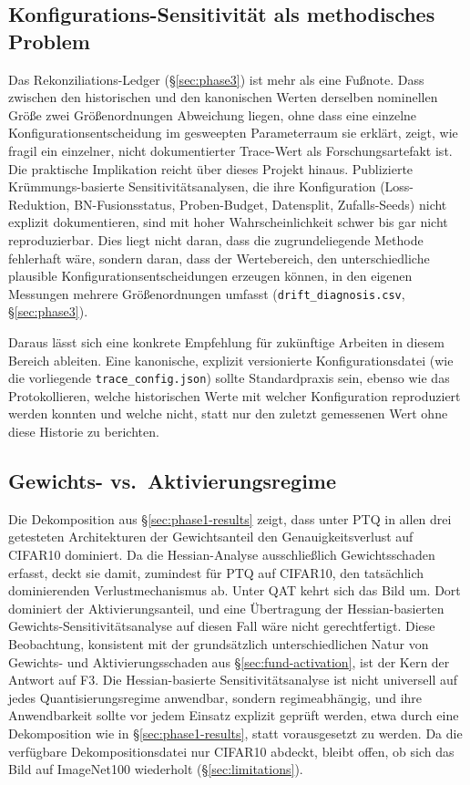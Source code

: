 \subsection{Konfigurations-Sensitivität als methodisches Problem}
\label{sec:disc-config}

Das Rekonziliations-Ledger (\S\ref{sec:phase3}) ist mehr als eine Fußnote. Dass zwischen den historischen und den kanonischen Werten derselben nominellen Größe zwei Größenordnungen Abweichung liegen, ohne dass eine einzelne Konfigurationsentscheidung im gesweepten Parameterraum sie erklärt, zeigt, wie fragil ein einzelner, nicht dokumentierter Trace-Wert als Forschungsartefakt ist. Die praktische Implikation reicht über dieses Projekt hinaus. Publizierte Krümmungs-basierte Sensitivitätsanalysen, die ihre Konfiguration (Loss-Reduktion, BN-Fusionsstatus, Proben-Budget, Datensplit, Zufalls-Seeds) nicht explizit dokumentieren, sind mit hoher Wahrscheinlichkeit schwer bis gar nicht reproduzierbar. Dies liegt nicht daran, dass die zugrundeliegende Methode fehlerhaft wäre, sondern daran, dass der Wertebereich, den unterschiedliche plausible Konfigurationsentscheidungen erzeugen können, in den eigenen Messungen mehrere Größenordnungen umfasst (\texttt{drift\_diagnosis.csv}, \S\ref{sec:phase3}).
\par\medskip

Daraus lässt sich eine konkrete Empfehlung für zukünftige Arbeiten in diesem Bereich ableiten. Eine kanonische, explizit versionierte Konfigurationsdatei (wie die vorliegende \texttt{trace\_config.json}) sollte Standardpraxis sein, ebenso wie das Protokollieren, welche historischen Werte mit welcher Konfiguration reproduziert werden konnten und welche nicht, statt nur den zuletzt gemessenen Wert ohne diese Historie zu berichten.

\subsection{Gewichts- vs.\ Aktivierungsregime}
\label{sec:disc-regime}

Die Dekomposition aus \S\ref{sec:phase1-results} zeigt, dass unter PTQ in allen drei getesteten Architekturen der Gewichtsanteil den Genauigkeitsverlust auf CIFAR10 dominiert. Da die Hessian-Analyse ausschließlich Gewichtsschaden erfasst, deckt sie damit, zumindest für PTQ auf CIFAR10, den tatsächlich dominierenden Verlustmechanismus ab. Unter QAT kehrt sich das Bild um. Dort dominiert der Aktivierungsanteil, und eine Übertragung der Hessian-basierten Gewichts-Sensitivitätsanalyse auf diesen Fall wäre nicht gerechtfertigt. Diese Beobachtung, konsistent mit der grundsätzlich unterschiedlichen Natur von Gewichts- und Aktivierungsschaden aus \S\ref{sec:fund-activation}, ist der Kern der Antwort auf F3. Die Hessian-basierte Sensitivitätsanalyse ist nicht universell auf jedes Quantisierungsregime anwendbar, sondern regimeabhängig, und ihre Anwendbarkeit sollte vor jedem Einsatz explizit geprüft werden, etwa durch eine Dekomposition wie in \S\ref{sec:phase1-results}, statt vorausgesetzt zu werden. Da die verfügbare Dekompositionsdatei nur CIFAR10 abdeckt, bleibt offen, ob sich das Bild auf ImageNet100 wiederholt (\S\ref{sec:limitations}).

